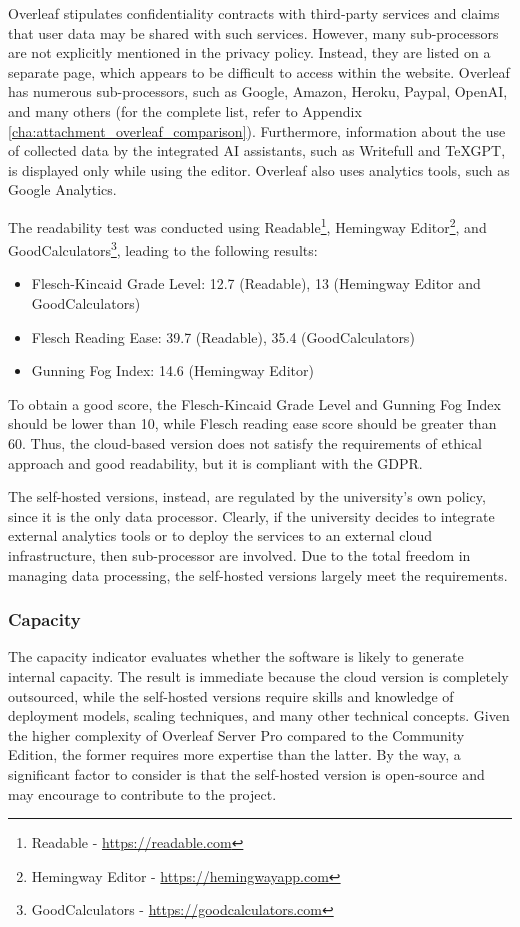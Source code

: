Overleaf stipulates confidentiality contracts with third-party services and claims that user data may be shared with such services. However, many sub-processors are not explicitly mentioned in the privacy policy. Instead, they are listed on a separate page, which appears to be difficult to access within the website. Overleaf has numerous sub-processors, such as Google, Amazon, Heroku, Paypal, OpenAI, and many others (for the complete list, refer to Appendix \ref{cha:attachment_overleaf_comparison}).  Furthermore, information about the use of collected data by the integrated AI assistants, such as Writefull and TeXGPT, is displayed only while using the editor. Overleaf also uses analytics tools, such as Google Analytics.

The readability test was conducted using Readable\footnote{Readable - \href{https://readable.com/}{https://readable.com}}, Hemingway Editor\footnote{Hemingway Editor - \href{https://hemingwayapp.com/}{https://hemingwayapp.com}}, and GoodCalculators\footnote{GoodCalculators - \href{https://goodcalculators.com/}{https://goodcalculators.com}}, leading to the following results:
\begin{itemize}[noitemsep, topsep=4pt, parsep=0pt, partopsep=0pt]
    \item Flesch-Kincaid Grade Level: 12.7 (Readable), 13 (Hemingway Editor and GoodCalculators)
    \item Flesch Reading Ease: 39.7 (Readable), 35.4 (GoodCalculators)
    \item Gunning Fog Index: 14.6 (Hemingway Editor)
\end{itemize}
To obtain a good score, the Flesch-Kincaid Grade Level and Gunning Fog Index should be lower than 10, while Flesch reading ease score should be greater than 60. Thus, the cloud-based version does not satisfy the requirements of ethical approach and good readability, but it is compliant with the GDPR. 

The self-hosted versions, instead, are regulated by the university's own policy, since it is the only data processor. Clearly, if the university decides to integrate external analytics tools or to deploy the services to an external cloud infrastructure, then sub-processor are involved. Due to the total freedom in managing data processing, the self-hosted versions largely meet the requirements. 

\subsubsection{Capacity}
The capacity indicator evaluates whether the software is likely to generate internal capacity. The result is immediate because the cloud version is completely outsourced, while the self-hosted versions require skills and knowledge of deployment models, scaling techniques, and many other technical concepts. Given the higher complexity of Overleaf Server Pro compared to the Community Edition, the former requires more expertise than the latter. By the way, a significant factor to consider is that the self-hosted version is open-source and may encourage to contribute to the project. 

